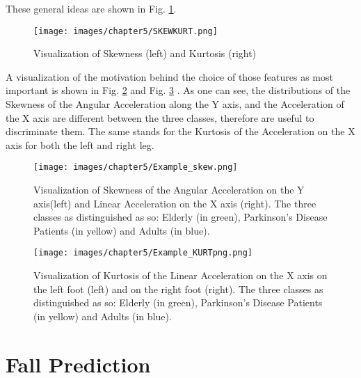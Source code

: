 These general ideas are shown in Fig. \ref{fig:SKEWKURT}.

\begin{figure}[h!]
    \centering
    \texttt{[image: images/chapter5/SKEWKURT.png]}
    \caption{Visualization of Skewness (left) and Kurtosis (right)}
    \label{fig:SKEWKURT}
\end{figure}


A visualization of the motivation behind the choice of those features as most important is shown in Fig. \ref{fig:Example_skew} and Fig. \ref{fig:Example_KURTpng} . As one can see, the distributions of the Skewness of the Angular Acceleration along the Y axis, and the Acceleration of the X axis are different between the three classes, therefore are useful to discriminate them. The same stands for the Kurtosis of the Acceleration on the X axis for both the left and right leg.
\begin{figure}[h!]
    \centering
    \texttt{[image: images/chapter5/Example\_skew.png]}
    \caption{Visualization of Skewness of the Angular Acceleration on the Y axis(left) and Linear Acceleration on the X axis (right).
    The three classes as distinguished as so: Elderly (in green), Parkinson's Disease Patients (in yellow) and Adults (in blue).}
    \label{fig:Example_skew}
\end{figure}
\begin{figure}[h!]
    \centering
    \texttt{[image: images/chapter5/Example\_KURTpng.png]}
    \caption{Visualization of Kurtosis of the Linear Acceleration on the X axis on the left foot (left) and on the right foot (right).
    The three classes as distinguished as so: Elderly (in green), Parkinson's Disease Patients (in yellow) and Adults (in blue).}
    \label{fig:Example_KURTpng}
\end{figure}


\section{Fall Prediction}

